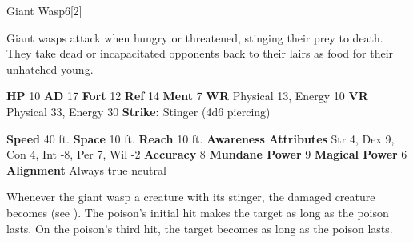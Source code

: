   \begin{monsection}{Giant Wasp}{6}[2]
    \vspace{-1em}\vspace{-1em}
    \vspace{0em}

    
      Giant wasps attack when hungry or threatened, stinging their prey to death.
      They take dead or incapacitated opponents back to their lairs as food for their unhatched young.
    
    

    \begin{spellcontent}
      \begin{spelltargetinginfo}
        \pari \textbf{HP} 10 \monsep
          \textbf{AD} 17 \monsep
          \textbf{Fort} 12 \monsep
          \textbf{Ref} 14 \monsep
          \textbf{Ment} 7
        \pari \textbf{WR} Physical 13, Energy 10 \monsep
        \textbf{VR} Physical 33, Energy 30
        \pari \textbf{Strike:}
            Stinger  (4d6 piercing)
      \end{spelltargetinginfo}
    \end{spellcontent}
    \begin{monsterfooter}
      \pari \textbf{Speed} 40 ft. \monsep
        \textbf{Space} 10 ft. \monsep
        \textbf{Reach} 10 ft.
      \pari \textbf{Awareness} 
      \pari \textbf{Attributes}
        Str 4, Dex 9,
        Con 4, Int -8,
        Per 7, Wil -2
      \pari \textbf{Accuracy} 8 \monsep
        \textbf{Mundane Power} 9 \monsep
      \textbf{Magical Power} 6
      \pari \textbf{Alignment} Always true neutral
    \end{monsterfooter}
  \end{monsection}
          Whenever the giant wasp  a creature with its stinger,
            the damaged creature becomes  (see ).
          The poison's initial hit makes the target  as long as the poison lasts.
          On the poison's third hit, the target becomes  as long as the poison lasts.
  
